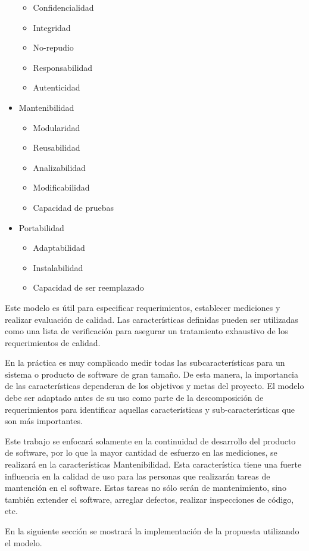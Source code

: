 \begin{itemize}
    \begin{itemize}
        \item Confidencialidad
        \item Integridad
        \item No-repudio
        \item Responsabilidad
        \item Autenticidad
    \end{itemize}
\item Mantenibilidad
    \begin{itemize}
        \item Modularidad
        \item Reusabilidad
        \item Analizabilidad
        \item Modificabilidad
        \item Capacidad de pruebas
    \end{itemize}
\item Portabilidad
    \begin{itemize}
        \item Adaptabilidad
        \item Instalabilidad
        \item Capacidad de ser reemplazado
    \end{itemize}
\end{itemize}

Este modelo es útil para especificar requerimientos, establecer mediciones y 
realizar evaluación de calidad. Las características definidas pueden ser utilizadas
como una lista de verificación para asegurar un tratamiento exhaustivo de
los requerimientos de calidad.

En la práctica es muy complicado medir todas las subcaracterísticas para un sistema
o producto de software de gran tamaño. De esta manera, la importancia de las 
características dependeran de los objetivos y metas del proyecto. El modelo
debe ser adaptado antes de su uso como parte de la descomposición de requerimientos
para identificar aquellas características y sub-características que son más
importantes.

Este trabajo se enfocará solamente en la continuidad de desarrollo del producto
de software, por lo que la mayor cantidad de esfuerzo en las mediciones, se
realizará en la características Mantenibilidad. Esta característica tiene
una fuerte influencia en la calidad de uso para las personas que realizarán
tareas de mantención en el software. Estas tareas no sólo serán de mantenimiento,
sino también extender el software, arreglar defectos, realizar inspecciones
de código, etc.

En la siguiente sección se mostrará la implementación de la propuesta
utilizando el modelo.
